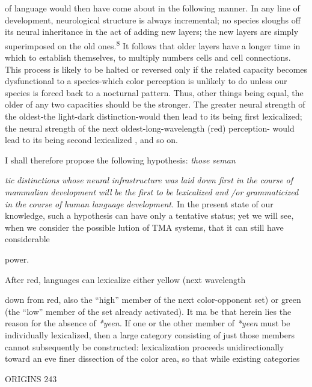 of language would then have come about in the following manner. In any line of development, neurological structure is always incremental; no species sloughs off its neural inheritance in the act of adding new layers; the new layers are simply superimposed on the old ones.\textsuperscript{8} It follows that older layers have a longer time in which to establish themselves, to multiply numbers cells and cell connections. This process is likely to be halted or reversed only if the related capacity becomes dysfunctional to a species-which color perception is unlikely to do unless our species is forced back to a nocturnal pattern. Thus, other things being equal, the older of any two capacities should be the stronger. The greater neural strength of the oldest-the light-dark distinction-would then lead to its being first lexicalized; the neural strength of the next oldest-long-wavelength (red) perception- would lead to its being second lexicalized , and so on.

I shall therefore propose the following hypothesis: \textit{those} \textit{seman\-}

\textit{tic} \textit{distinctions} \textit{whose} \textit{neural} \textit{i}\textit{n}\textit{frastructure was} \textit{laid} \textit{down first} \textit{in} \textit{the} \textit{course} \textit{o}\textit{f} \textit{mammalian} \textit{development} \textit{will} \textit{be} \textit{the} \textit{first to} \textit{be} \textit{lexicalized} \textit{and} \textit{/or} \textit{grammaticized in} \textit{the} \textit{course} \textit{o}\textit{f} \textit{human} \textit{language} \textit{development.} In the present state of our knowledge, such a hypothesis can have only a tentative status; yet we will see, when we consider the possible lution of TMA systems, that it can still have considerable

power.

After red, languages can lexicalize either yellow (next wavelength

down from red, also the ``high'' member of the next color-opponent set) or green (the ``low'' member of the set already activated). It ma be that herein lies the reason for the absence of \textit{*yeen.} If one or the other member of \textit{*yeen} must be individually lexicalized, then a large category consisting of just those members cannot subsequently be constructed: lexicalization proceeds unidirectionally toward an eve finer dissection of the color area, so that while existing categories

ORIGINS 243

